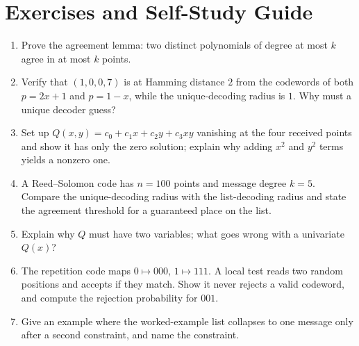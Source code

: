 \section{Exercises and Self-Study Guide}
\begin{enumerate}[label=\textbf{E\arabic*.}]
\item Prove the agreement lemma: two distinct polynomials of degree at most $k$ agree in at most $k$ points.

\item Verify that $(1,0,0,7)$ is at Hamming distance $2$ from the codewords of both $p=2x+1$ and $p=1-x$, while the unique-decoding radius is $1$. Why must a unique decoder guess?

\item Set up $Q(x,y)=c_0+c_1x+c_2y+c_3xy$ vanishing at the four received points and show it has only the zero solution; explain why adding $x^2$ and $y^2$ terms yields a nonzero one.

\item A Reed--Solomon code has $n=100$ points and message degree $k=5$. Compare the unique-decoding radius with the list-decoding radius and state the agreement threshold for a guaranteed place on the list.

\item Explain why $Q$ must have two variables; what goes wrong with a univariate $Q(x)$?

\item The repetition code maps $0\mapsto000$, $1\mapsto111$. A local test reads two random positions and accepts if they match. Show it never rejects a valid codeword, and compute the rejection probability for $001$.

\item Give an example where the worked-example list collapses to one message only after a second constraint, and name the constraint.
\end{enumerate}

\clearpage
